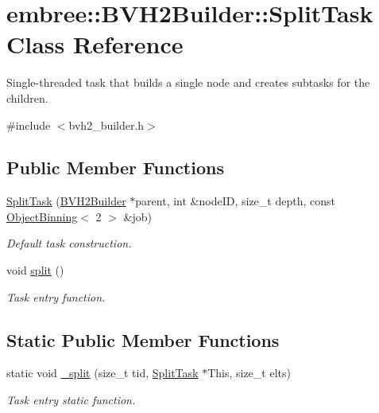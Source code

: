 \hypertarget{classembree_1_1_b_v_h2_builder_1_1_split_task}{
\section{embree::BVH2Builder::SplitTask Class Reference}
\label{classembree_1_1_b_v_h2_builder_1_1_split_task}
}


Single-\/threaded task that builds a single node and creates subtasks for the children.  




{\ttfamily \#include $<$bvh2\_\-builder.h$>$}

\subsection*{Public Member Functions}
\begin{DoxyCompactItemize}
\item 
\hyperlink{classembree_1_1_b_v_h2_builder_1_1_split_task_a743330eb2e45e78f9ecb6a30ea6b24e6}{SplitTask} (\hyperlink{classembree_1_1_b_v_h2_builder}{BVH2Builder} $\ast$parent, int \&nodeID, size\_\-t depth, const \hyperlink{classembree_1_1_object_binning}{ObjectBinning}$<$ 2 $>$ \&job)
\begin{DoxyCompactList}\small\item\em Default task construction. \item\end{DoxyCompactList}\item 
void \hyperlink{classembree_1_1_b_v_h2_builder_1_1_split_task_a8458a27bc3f0fe437a2cf8bb6c02e0bf}{split} ()
\begin{DoxyCompactList}\small\item\em Task entry function. \item\end{DoxyCompactList}\end{DoxyCompactItemize}
\subsection*{Static Public Member Functions}
\begin{DoxyCompactItemize}
\item 
static void \hyperlink{classembree_1_1_b_v_h2_builder_1_1_split_task_ab67bd15abbc7eb1a8e90b79f2d7a7953}{\_\-split} (size\_\-t tid, \hyperlink{classembree_1_1_b_v_h2_builder_1_1_split_task}{SplitTask} $\ast$This, size\_\-t elts)
\begin{DoxyCompactList}\small\item\em Task entry static function. \item\end{DoxyCompactList}\end{DoxyCompactItemize}


